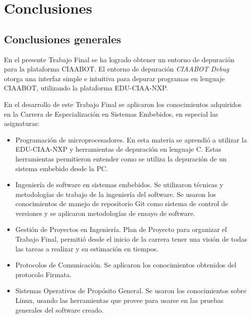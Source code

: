 
\chapter{Conclusiones} %

\label{Chapter5} %




\section{Conclusiones generales }

En el presente Trabajo Final se ha logrado obtener un entorno de depuración para la plataforma CIAABOT. El entorno de depuración \emph{ CIAABOT Debug} otorga una interfaz simple e intuitiva para depurar programas en lenguaje CIAABOT, utilizando la plataforma EDU-CIAA-NXP.

En el desarrollo de este Trabajo Final se aplicaron los conocimientos adquiridos en la Carrera de Especialización en Sistemas Embebidos, en especial las asignaturas:

\begin{itemize}
	\item Programación de microprocesadores. En esta materia se aprendió a utilizar la EDU-CIAA-NXP y herramientas de depuración en lenguaje C. Estas herramientas permitieron entender como se utiliza la depuración de un sistema embebido desde la PC.
	\item Ingeniería de software en sistemas embebidos. Se utilizaron técnicas y metodologías de trabajo de la ingeniería del software. Se usaron los conocimientos de manejo de repositorio Git como sistema de control de versiones y se aplicaron metodologías de ensayo de software.
	\item Gestión de Proyectos en Ingeniería. Plan de Proyecto para organizar el Trabajo Final, permitió desde el inicio de la carrera tener una visión de todas las tareas a realizar y su estimación en tiempos.
	\item Protocolos de Comunicación. Se aplicaron los conocimientos obtenidos del protocolo Firmata.
	\item Sistemas Operativos de Propósito General. Se usaron los conocimientos sobre Linux, usando las herramientas que provee para usarse en las pruebas generales del software creado.
\end{itemize}



